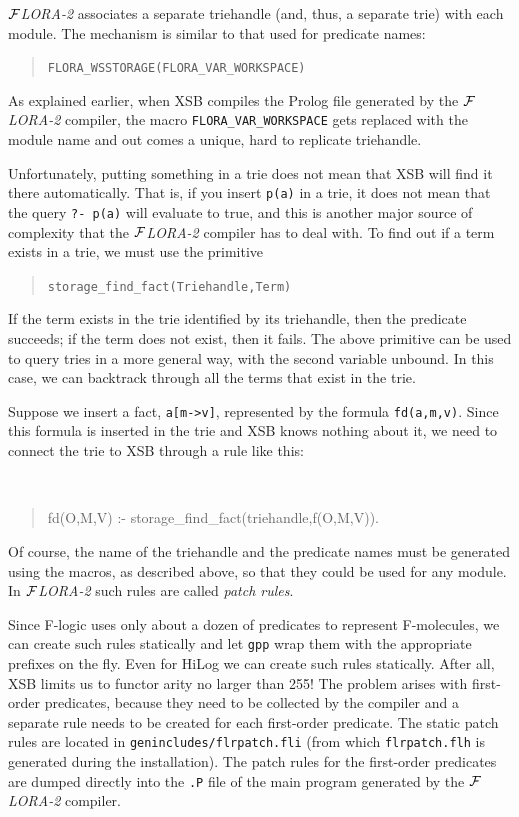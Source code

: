 \documentclass[11pt]{article}
\newcommand{\FLORA}{{\mbox{${\cal F}${\small\it LORA}\rm\emph{-2}}}\xspace}
\newcommand{\fl}{\mbox{F-logic}\xspace}
\begin{document}
\FLORA associates a separate triehandle (and, thus, a separate trie) with
each module. The mechanism is similar to that used for predicate names:
\begin{quote}
 \tt FLORA\_WSSTORAGE(FLORA\_VAR\_WORKSPACE)  
\end{quote}
As explained earlier, when XSB compiles the Prolog file generated by the
\FLORA compiler, the macro {\tt FLORA\_VAR\_WORKSPACE} gets replaced with
the module name and out comes a unique, hard to replicate triehandle.

Unfortunately, putting something in a trie does not mean that XSB will find
it there automatically. That is, if you insert {\tt p(a)} in a trie, it
does not mean that the query {\tt ?- p(a)} will evaluate to true, and this
is another major source of complexity that the \FLORA compiler has to deal
with. To find out if a term exists in a trie, we must use the primitive
\begin{quote}
 \tt storage\_find\_fact(Triehandle,Term)  
\end{quote}
If the term exists in the trie identified by its triehandle, then the
predicate succeeds; if the term does not exist, then it fails. The above
primitive can be used to query tries in a more general way, with the second
variable unbound. In this case, we can backtrack through all the terms that
exist in the trie.

Suppose we insert a fact, {\tt a[m->v]}, represented by the formula
{\tt fd(a,m,v)}. Since this formula is inserted in the trie and XSB knows
nothing about it, we need to connect the trie to XSB through a rule like this:
{\tt
\begin{quote}
  fd(O,M,V) :- storage\_find\_fact(triehandle,f(O,M,V)).
\end{quote}
}
Of course, the name of the triehandle and the predicate names must be
generated using the macros, as described above, so that they could be used
for any module. In \FLORA such rules are called \emph{patch rules}. 

Since \fl uses only about a dozen of predicates to represent
F-molecules, we can create such rules statically and let {\tt gpp} wrap
them with the appropriate prefixes on the fly. Even for HiLog we can create
such rules statically. After all, XSB limits us to functor arity no larger
than 255! The problem arises with first-order predicates, because they need
to be collected by the compiler and a separate rule needs to be created for
each first-order predicate. The static patch rules are located in
{\tt genincludes/flrpatch.fli} (from which {\tt flrpatch.flh} is generated
during the installation).  The patch rules for the first-order
predicates are dumped directly into the {\tt .P} file of the main program
generated by the \FLORA compiler.
\end{document}
